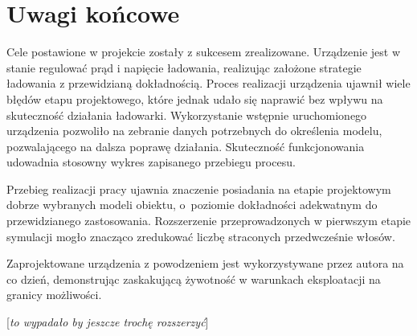 \documentclass[polish,engineer]{polsl-msth}
\newcommand{\remark}[1]{{[\color{GREEN}\emph{\footnotesize #1}{}]}}
\begin{document}
\chapter{Uwagi końcowe}
Cele postawione w projekcie zostały z sukcesem zrealizowane. Urządzenie jest w stanie regulować prąd i napięcie ładowania, realizując założone strategie ładowania z przewidzianą dokładnością. Proces realizacji urządzenia ujawnił wiele błędów etapu projektowego, które jednak udało się naprawić bez wpływu na skuteczność działania ładowarki. Wykorzystanie wstępnie uruchomionego urządzenia pozwoliło na zebranie danych potrzebnych do określenia modelu, pozwalającego na dalsza poprawę działania. Skuteczność funkcjonowania udowadnia stosowny wykres zapisanego przebiegu procesu.

Przebieg realizacji pracy ujawnia znaczenie posiadania na etapie projektowym dobrze wybranych modeli obiektu, o~poziomie dokładności adekwatnym do przewidzianego zastosowania. Rozszerzenie przeprowadzonych w pierwszym etapie symulacji mogło znacząco zredukować liczbę straconych przedwcześnie włosów.

Zaprojektowane urządzenia z powodzeniem jest wykorzystywane przez autora na co dzień, demonstrując zaskakującą żywotność w warunkach eksploatacji na granicy możliwości.

\remark{to wypadało by jeszcze trochę rozszerzyć}

 

\end{document}
